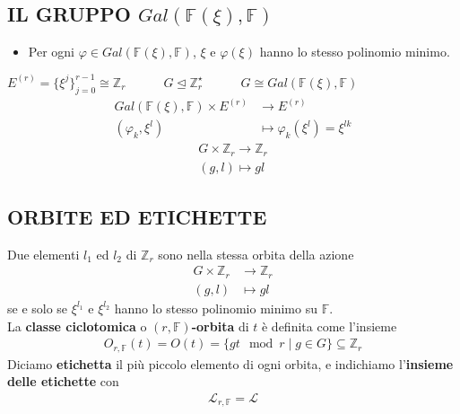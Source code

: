 \documentclass[mathserif]{beamer}
\begin{document}
\subsection{IL GRUPPO $Gal(\mathbb{F}(\xi), \mathbb{F})$}
\begin{frame}
\begin{itemize}
   \item Per ogni $\varphi \in Gal(\mathbb{F}(\xi), \mathbb{F})$, $\xi$ e $\varphi(\xi)$ hanno lo stesso
      polinomio minimo.
\end{itemize}

\vspace{0.5cm}

   $E^{(r)} = \lbrace \xi^{j}\rbrace_{j=0}^{r-1}\cong \mathbb{Z}_{r}
   \qquad \quad
   G \trianglelefteq \mathbb{Z}_{r}^{\star}
   \qquad  \quad
   G \cong Gal(\mathbb{F}(\xi), \mathbb{F})$
   \vspace{0.5cm}
   \begin{align*}
	Gal(\mathbb{F}(\xi), \mathbb{F}) \times E^{(r)}  & \longrightarrow  E^{(r)}   \\
		  (\varphi_{k},\xi^{l}) & \longmapsto \varphi_{k}(\xi^{l}) = \xi^{lk}
    \end{align*}
    \begin{align*}
	G \times \mathbb{Z}_{r} \longrightarrow  \mathbb{Z}_{r}   \\
		  (g,l) \longmapsto gl
    \end{align*}
\end{frame}

\subsection{ORBITE ED ETICHETTE}
\begin{frame}
       Due elementi $l_{1}$ ed $l_{2}$ di $\mathbb{Z}_{r}$ sono nella stessa orbita della azione
	\begin{align*}
	G \times \mathbb{Z}_{r} &\longrightarrow  \mathbb{Z}_{r}   \\
		  (g,l) &\longmapsto gl
	\end{align*}
	se e solo se $\xi^{l_{1}}$ e $\xi^{l_{2}}$ hanno lo stesso polinomio minimo su $\mathbb{F}$.\\
        La {\bf classe ciclotomica} o {\bf $(r,\mathbb{F})$-orbita} di $t$ è definita come l'insieme
	\begin{align*}
	  O_{r,\mathbb{F}}(t) = O(t) = \lbrace gt \mod{r} \mid g \in G \rbrace \subseteq  \mathbb{Z}_{r}
	\end{align*}
	Diciamo {\bf etichetta} il più piccolo elemento di ogni orbita, e indichiamo l'{\bf insieme delle etichette} con
	\begin{align*}
	   \mathscr{L}_{r,\mathbb{F}} = \mathscr{L}
	\end{align*}
\end{frame}
\end{document}
